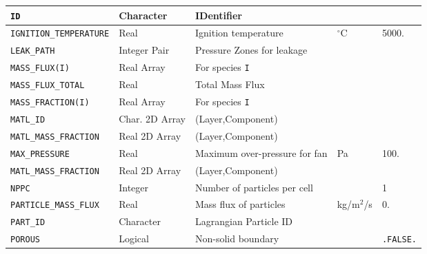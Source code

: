 \documentclass[11pt]{book}
\newcommand{\ct}{\tt\small}
\begin{document}
\begin{longtable}{|l|l|l|l|l|}
{\ct ID     }                         & Character       & IDentifier                        &                     &                         \\ \hline
{\ct IGNITION\_TEMPERATURE}           & Real            & Ignition temperature              & $^\circ$C           & 5000.                   \\ \hline
{\ct LEAK\_PATH}                      & Integer Pair    & Pressure Zones for leakage        &                     &                         \\ \hline
{\ct MASS\_FLUX(I)}                   & Real Array      & For species {\ct I}               &                     &                         \\ \hline
{\ct MASS\_FLUX\_TOTAL}               & Real            & Total Mass Flux                   &                     &                         \\ \hline
{\ct MASS\_FRACTION(I)}               & Real Array      & For species {\ct I}               &                     &                         \\ \hline
{\ct MATL\_ID}                        & Char. 2D Array  & (Layer,Component)                 &                     &                         \\ \hline
{\ct MATL\_MASS\_FRACTION}            & Real 2D Array   & (Layer,Component)                 &                     &                         \\ \hline
{\ct MAX\_PRESSURE }                  & Real            & Maximum over-pressure for fan     & Pa                  & 100.                    \\ \hline
{\ct MATL\_MASS\_FRACTION}            & Real 2D Array   & (Layer,Component)                 &                     &                         \\ \hline
{\ct NPPC}                            & Integer         & Number of particles per cell      &                     & 1                       \\ \hline
{\ct PARTICLE\_MASS\_FLUX}            & Real            & Mass flux of particles            & kg/m$^2$/s          & 0.                      \\ \hline
{\ct PART\_ID}                        & Character       & Lagrangian Particle ID            &                     &                         \\ \hline
{\ct POROUS}                          & Logical         & Non-solid boundary                &                     & {\ct .FALSE.}           \\ \hline

\end{longtable}
\end{document}
